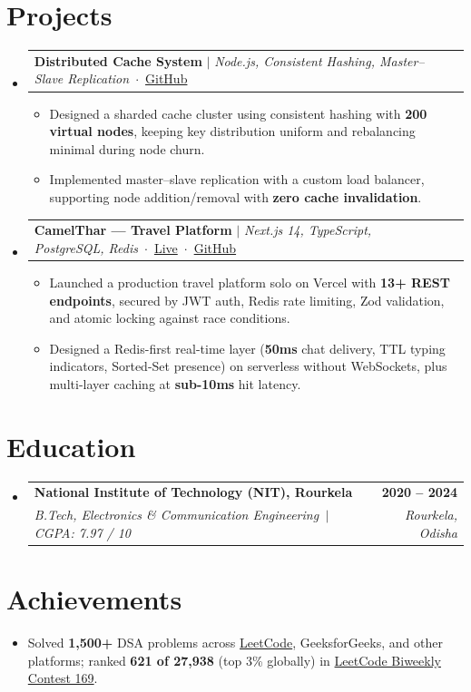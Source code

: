 \documentclass[a4paper,11pt]{article}
\makeatletter
\newcommand{\resumeItem}[1]{
  \item\small{#1 \vspace{-2pt}}
}
\newcommand{\resumeSubheading}[4]{
  \vspace{-2pt}\item
    \begin{tabular*}{0.97\textwidth}[t]{l@{\extracolsep{\fill}}r}
      \textbf{#1} & \textbf{\small #2} \\
      \textit{\small#3} & \textit{\small #4} \\
    \end{tabular*}\vspace{-7pt}
}
\newcommand{\resumeProjectHeading}[1]{
    \item
    \begin{tabular*}{0.97\textwidth}{l@{\extracolsep{\fill}}r}
      \small#1 & \\
    \end{tabular*}\vspace{-7pt}
}
\newcommand{\resumeSubHeadingListStart}{\begin{itemize}[leftmargin=0.15in, label={}, topsep=2pt]}
\newcommand{\resumeSubHeadingListEnd}{\end{itemize}}
\newcommand{\resumeItemListStart}{\begin{itemize}[leftmargin=0.2in, itemsep=0pt, topsep=2pt]}
\newcommand{\resumeItemListEnd}{\end{itemize}\vspace{-5pt}}
\makeatother
\begin{document}
\section{Projects}
\resumeSubHeadingListStart

  \resumeProjectHeading{\textbf{Distributed Cache System} $|$ \emph{Node.js, Consistent Hashing, Master--Slave Replication} \,$\cdot$\, \href{https://github.com/abhishekkumar2024/distributed-cache}{GitHub}}
  \resumeItemListStart
    \resumeItem{Designed a sharded cache cluster using consistent hashing with \textbf{200 virtual nodes}, keeping key distribution uniform and rebalancing minimal during node churn.}
    \resumeItem{Implemented master--slave replication with a custom load balancer, supporting node addition/removal with \textbf{zero cache invalidation}.}
  \resumeItemListEnd

  \vspace{3pt}
  \resumeProjectHeading{\textbf{CamelThar --- Travel Platform} $|$ \emph{Next.js 14, TypeScript, PostgreSQL, Redis} \,$\cdot$\, \href{https://www.camelthar.com}{Live} \,$\cdot$\, \href{https://github.com/abhishekkumar2024/TravelWebsite}{GitHub}}
  \resumeItemListStart
    \resumeItem{Launched a production travel platform solo on Vercel with \textbf{13+ REST endpoints}, secured by JWT auth, Redis rate limiting, Zod validation, and atomic locking against race conditions.}
    \resumeItem{Designed a Redis-first real-time layer (\textbf{50ms} chat delivery, TTL typing indicators, Sorted-Set presence) on serverless without WebSockets, plus multi-layer caching at \textbf{sub-10ms} hit latency.}
  \resumeItemListEnd

\resumeSubHeadingListEnd

\section{Education}
\resumeSubHeadingListStart
  \resumeSubheading{National Institute of Technology (NIT), Rourkela}{2020 -- 2024}
    {B.Tech, Electronics \& Communication Engineering \,$|$\, CGPA: 7.97 / 10}{Rourkela, Odisha}
\resumeSubHeadingListEnd

\section{Achievements}
\begin{itemize}[leftmargin=0.2in, itemsep=0pt, topsep=2pt]
  \resumeItem{Solved \textbf{1,500+} DSA problems across \href{https://leetcode.com/u/verma_2020/}{LeetCode}, GeeksforGeeks, and other platforms; ranked \textbf{621 of 27,938} (top 3\% globally) in \href{https://leetcode.com/contest/biweekly-contest-169/ranking/?region=global_v2}{LeetCode Biweekly Contest 169}.}
\end{itemize}
\end{document}
